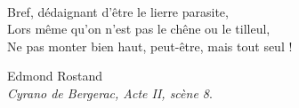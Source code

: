 
\cleardoublepage
\thispagestyle{empty}
\begin{fullwidth}
%
~\vfill

\hfill
\begin{minipage}{12cm}
    {\nohyphenation\noindent\fontsize{14}{18}\selectfont
        Bref, dédaignant d’être le lierre parasite,\\
        Lors même qu’on n’est pas le chêne ou le tilleul,\\
        Ne pas monter bien haut, peut-être, mais tout seul !\\[10pt]
        \begin{flushright}
        {\large\color{myblue}%
            Edmond Rostand\\
            {\itshape Cyrano de Bergerac, Acte II, scène 8}.
        }
        \end{flushright}
    }
\end{minipage}

\vfill

\end{fullwidth}